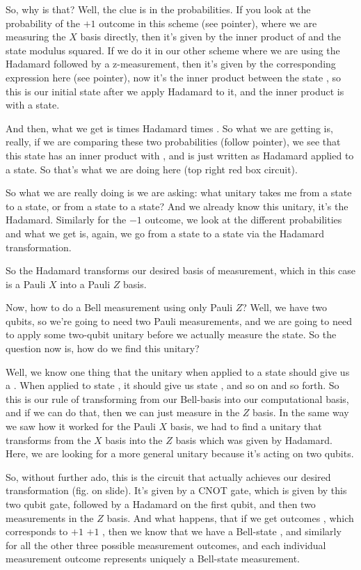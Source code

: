 So, why is that? Well, the clue is in the probabilities. If you look at the probability of the $+1$ outcome in this scheme (see pointer), where we are measuring the $X$ basis directly, then it's given by the inner product of \ket{\psi} and the \ket{+} state modulus squared. If we do it in our other scheme where we are using the Hadamard followed by a z-measurement, then it's given by the corresponding expression here (see pointer), now it's the inner product between the state , so this is our initial state after we apply Hadamard to it, and the inner product is with a  state.

And then, what we get is \ket{\psi} times Hadamard times . So what we are getting is, really, if we are comparing these two probabilities (follow pointer), we see that this \ket{\psi} state has an inner product with \ket{+}, and \ket{+} is just written as Hadamard applied to a  state. So that's what we are doing here (top right red box circuit).

So what we are really doing is we are asking: what unitary takes me from a \ket{+} state to a  state, or from a  state to a \ket{+} state? And we already know this unitary, it's the Hadamard. Similarly for the  $-1$ outcome, we look at the different probabilities and what we get is, again, we go from a \ket{-} state to a  state via the Hadamard transformation.

So the Hadamard transforms our desired basis of measurement, which in this case is a Pauli $X$ into a Pauli $Z$ basis.

Now, how to do a Bell measurement using only Pauli $Z$? Well, we have two qubits, so we're going to need two Pauli measurements, and we are going to need to apply some two-qubit unitary before we actually measure the state. So the question now is, how do we find this unitary?

Well, we know one thing that the unitary when applied to a state \ket{\Psi^+} should give us a . When applied to state \ket{\Phi^-}, it should give us state , and so on and so forth. So this is our rule of transforming from our Bell-basis into our computational basis, and if we can do that, then we can just measure in the $Z$ basis. In the same way we saw how it worked for the Pauli $X$ basis, we had to find a unitary that transforms from the $X$ basis into the $Z$ basis which was given by Hadamard. Here, we are looking for a more general unitary because it's acting on two qubits.

So, without further ado, this is the circuit that actually achieves our desired transformation (fig. on slide). It's given by a CNOT gate, which is given by this two qubit gate, followed by a Hadamard on the first qubit, and then two measurements in the $Z$ basis. And what happens, that if we get outcomes , which corresponds to  $+1$  $+1$ , then we know that we have a Bell-state \ket{\Phi^+}, and similarly for all the other three possible measurement outcomes, and each individual measurement outcome represents uniquely a Bell-state measurement.

